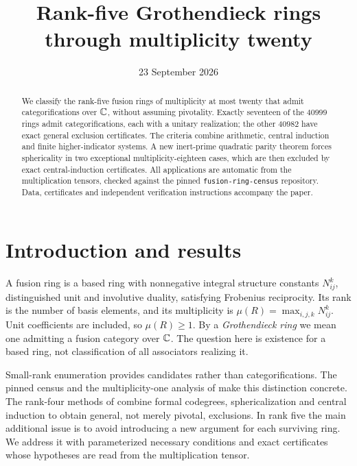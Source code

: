 \documentclass[11pt]{article}
\title{Rank-five Grothendieck rings through multiplicity twenty}
\date{23 September 2026}
\begin{document}
\maketitle
\begin{abstract}
We classify the rank-five fusion rings of multiplicity at most twenty
that admit categorifications over $\mathbb C$, without assuming pivotality.
Exactly seventeen of the $40999$ rings admit categorifications, each
with a unitary realization; the other $40982$ have exact general
exclusion certificates. The criteria combine arithmetic, central
induction and finite higher-indicator systems. A new inert-prime
quadratic parity theorem forces sphericality in two exceptional
multiplicity-eighteen cases, which are then excluded by
exact central-induction certificates. All applications are automatic
from the multiplication tensors, checked against the pinned
\texttt{fusion-ring-census} repository. Data, certificates and
independent verification instructions accompany the paper.
\end{abstract}
\setcounter{tocdepth}{1}
\tableofcontents

\section{Introduction and results}
A fusion ring is a based ring with nonnegative integral structure
constants $N_{ij}^k$, distinguished unit and involutive duality, satisfying
Frobenius reciprocity. Its rank is the number of basis elements, and its
multiplicity is $\mu(R)=\max_{i,j,k}N_{ij}^k$. Unit coefficients are included,
so $\mu(R)\ge1$. By a \emph{Grothendieck ring} we mean one admitting a
fusion category over $\mathbb C$. The question here is existence for a based
ring, not classification of all associators realizing it.

Small-rank enumeration provides candidates rather than categorifications.
The pinned census \cite{Census} and the multiplicity-one analysis of \cite{LPR}
make this distinction concrete. The rank-four methods of \cite{DP}
combine formal codegrees, sphericalization and central induction to
obtain general, not merely pivotal, exclusions. In rank five the main
additional issue is to avoid introducing a new argument for each surviving
ring. We address it with parameterized necessary conditions and exact
certificates whose hypotheses are read from the multiplication tensor.
\end{document}

